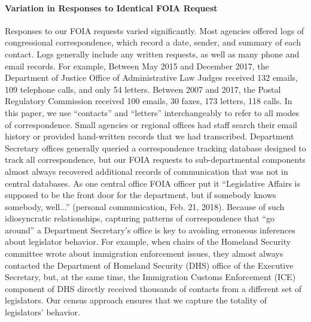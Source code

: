 \documentclass[12pt]{article}
\begin{document}
\paragraph{Variation in Responses to Identical FOIA Request} Responses to our FOIA requests varied significantly. Most agencies offered logs of congressional correspondence, which record a date, sender, and summary of each contact. Logs generally include any written requests, as well as many phone and email records. For example, Between May 2015 and December 2017, the Department of Justice Office of Administrative Law Judges received 132 emails, 109 telephone calls, and only 54 letters. Between 2007 and 2017, the Postal Regulatory Commission received 100 emails, 30 faxes, 173 letters, 118 calls. In this paper, we use ``contacts'' and ``letters'' interchangeably to refer to all modes of correspondence. Small agencies or regional offices had staff search their email history or provided hand-written records that we had transcribed.  Department Secretary offices generally queried a correspondence tracking database designed to track all correspondence, but our FOIA requests to sub-departmental components almost always recovered additional records of communication that was not in central databases. As one central office FOIA officer put it ``Legislative Affairs is supposed to be the front door for the department, but if somebody knows somebody, well...'' (personal communication, Feb. 21, 2018). Because of such idiosyncratic relationships, capturing patterns of correspondence that ``go around'' a Department Secretary's office is key to avoiding erroneous inferences about legislator behavior. For example, when chairs of the Homeland Security committee wrote about immigration enforcement issues, they almost always contacted the Department of Homeland Security (DHS) office of the Executive Secretary, but, at the same time, the Immigration Customs Enforcement (ICE) component of DHS directly received thousands of contacts from a different set of legislators. Our census approach ensures that we capture the totality of legislators' behavior. 
\end{document}
